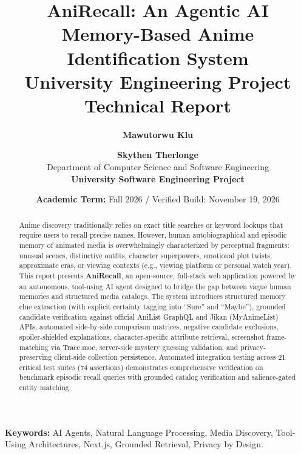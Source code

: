 \documentclass[11pt,a4paper]{article}
\title{\textbf{AniRecall: An Agentic AI Memory-Based Anime Identification System}\\[0.3em]
\large University Engineering Project Technical Report}
\author{
    \textbf{Mawutorwu Klu} \and \textbf{Skythen Therlonge} \\
    Department of Computer Science and Software Engineering \\
    \textbf{University Software Engineering Project}
}
\date{\textbf{Academic Term:} Fall 2026 / Verified Build: November 19, 2026}
\begin{document}
\maketitle

\begin{abstract}
Anime discovery traditionally relies on exact title searches or keyword lookups that require users to recall precise names. However, human autobiographical and episodic memory of animated media is overwhelmingly characterized by perceptual fragments: unusual scenes, distinctive outfits, character superpowers, emotional plot twists, approximate eras, or viewing contexts (e.g., viewing platform or personal watch year). This report presents \textbf{AniRecall}, an open-source, full-stack web application powered by an autonomous, tool-using AI agent designed to bridge the gap between vague human memories and structured media catalogs. The system introduces structured memory clue extraction (with explicit certainty tagging into ``Sure'' and ``Maybe''), grounded candidate verification against official AniList GraphQL and Jikan (MyAnimeList) APIs, automated side-by-side comparison matrices, negative candidate exclusions, spoiler-shielded explanations, character-specific attribute retrieval, screenshot frame-matching via Trace.moe, server-side mystery guessing validation, and privacy-preserving client-side collection persistence. Automated integration testing across 21 critical test suites (74 assertions) demonstrates comprehensive verification on benchmark episodic recall queries with grounded catalog verification and salience-gated entity matching.
\end{abstract}

\vspace{0.5em}
\noindent \textbf{Keywords:} AI Agents, Natural Language Processing, Media Discovery, Tool-Using Architectures, Next.js, Grounded Retrieval, Privacy by Design.

\vspace{0.8em}
\noindent{}
\end{document}
